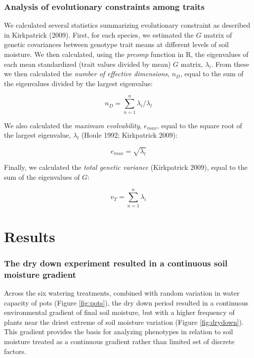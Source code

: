 \documentclass[jou,floatsintext]{apa6}
\begin{document}
\hypertarget{analysis-of-evolutionary-constraints-among-traits}{%
\subsubsection{Analysis of evolutionary constraints among traits}\label{analysis-of-evolutionary-constraints-among-traits}}

We calculated several statistics summarizing evolutionary constraint as described in Kirkpatrick (2009). First, for each species, we estimated the \(G\) matrix of genetic covariances between genotype trait means at different levels of soil moisture. We then calculated, using the \emph{prcomp} function in R, the eigenvalues of each mean standardized (trait values divided by mean) \(G\) matrix, \(\lambda_i\). From these we then calculated the \emph{number of effective dimensions}, \(n_{D}\), equal to the sum of the eigenvalues divided by the largest eigenvalue:

\[n_{D} = \sum_{n=1}^{n} \lambda_i/\lambda_l\]

We also calculated the \emph{maximum evolvability}, \(e_{max}\), equal to the square root of the largest eigenvalue, \(\lambda_l\) (Houle 1992; Kirkpatrick 2009):

\[e_{max} = \sqrt{\lambda_l}\]

Finally, we calculated the \emph{total genetic variance} (Kirkpatrick 2009), equal to the sum of the eigenvalues of \(G\):

\[v_T = \sum_{n=1}^{n} \lambda_i\]

\hypertarget{results}{%
\section{Results}\label{results}}

\hypertarget{the-dry-down-experiment-resulted-in-a-continuous-soil-moisture-gradient}{%
\subsubsection{The dry down experiment resulted in a continuous soil moisture gradient}\label{the-dry-down-experiment-resulted-in-a-continuous-soil-moisture-gradient}}

Across the six watering treatments, combined with random variation in water capacity of pots (Figure \ref{fig:pots}), the dry down period resulted in a continuous environmental gradient of final soil moisture, but with a higher frequency of plants near the driest extreme of soil moisture variation (Figure \ref{fig:drydown}). This gradient provides the basis for analyzing phenotypes in relation to soil moisture treated as a continuous gradient rather than limited set of discrete factors.
\end{document}
